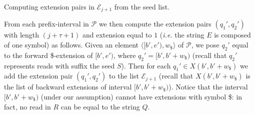\documentclass[runningheads,envcountsame,a4paper]{llncs}
\makeatletter
\newcommand{\paragrafo}{%
  \@startsection{paragraph}{4}{\z@ }{-7\p@ \@plus -4\p@ \@minus -4\p@
  }{-0.5em \@plus -0.22em \@minus -0.1em}{\normalfont \normalsize \itshape
  }
}
\newcommand{\notaestesa}[2]{%
 \marginpar{\color{red!75!black}\textbf{\texttimes}}%
 {\color{red!75!black}%
 [\,\textbullet\,\textsf{\textbf{#1:}} %
 \textsf{\footnotesize#2}\,\textbullet\,]}%
}
\newcommand{\ie}{\textit{i.e.}\xspace}
\newcommand{\rev}{\ensuremath{\mathrm{rev}}}
\makeatother
\begin{document}
\begin{comment}
\notaestesa{RR}{Aggiungere tutti i riferimenti allo pseudocodice dopo averlo sistemato}

\paragrafo{Computing the {\em seed-list}.}
Each element of the list $\mathcal{P}$ is made of a  \emph{prefix-interval} $[b',e')$
and its \$-width $w_\$ $ (recall that $w_\$ $ is  the number of     \$ backward \$-extension of  the $Q$-interval $[b,e)$ that is linked to $[b',e')$).
The list $\mathcal{P}$ is actually stored as a file and is sorted by ascending value of the starting
value $b'$ (\ie lexicographical order of $\rev(Q)$). \notaestesa{RR}{Citare il classico problema di ordinamento in memoria esterna con la relativa citazione}.
Notice that the only operations allowed on that file are appending an item to
the end and popping (\ie reading from the head and deleting) an item.

\end{comment}

\paragrafo{Computing  extension pairs in $\mathcal{E}_{j+1}$ from the seed list.}


From each  prefix-interval in $\mathcal{P}$ we then compute the extension pairs $(q_{1}', q_{2}')$ with
length $(j+\tau+1)$ and extension equal to $1$ (\ie the string $E$ is composed of one symbol) as follows.
Given an element  $\langle [b',e'), w_\$ \rangle$ of $\mathcal{P}$,
we pose $q_{2}'$ equal to the forward \$-extension of  $[b',e')$, where   $q_{2}' = [b',b'+w_\$)$
(recall that $q_{2}'$ represents reads with suffix the seed $S$).
%
Then
for each $q_{1}'\in X(b',b'+w_\$)$ we add the extension pair  $(q_{1}',q_{2}')$ to
the list $\mathcal{E}_{j+1}$ (recall that $ X(b',b'+w_\$)$ is the list of backward extensions of interval $[b',b'+w_\$)$).
Notice that the interval $[b', b'+w_\$)$ (under our assumption) cannot have
extensions with symbol \$: in fact, no read in $R$ can be equal to the string $Q$.
\end{document}
